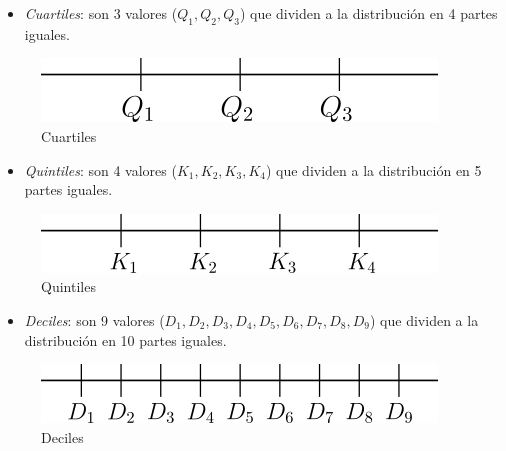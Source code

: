 \documentclass[
]{krantz}
\providecommand{\tightlist}{%
  \setlength{\itemsep}{0pt}\setlength{\parskip}{0pt}}
\begin{document}
\begin{itemize}
\tightlist
\item
  \emph{Cuartiles}: son 3 valores (\(Q_{1}, Q_{2}, Q_{3}\)) que dividen a la distribución en 4 partes iguales.
\end{itemize}

\begin{figure}[!h]

{\centering \includegraphics[width=0.5\linewidth]{cuartiles} 

}

\caption{Cuartiles}\label{fig:cuart}
\end{figure}

\begin{itemize}
\tightlist
\item
  \emph{Quintiles}: son 4 valores (\(K_{1}, K_{2}, K_{3}, K_{4}\)) que dividen a la distribución en 5 partes iguales.
\end{itemize}

\begin{figure}[!h]

{\centering \includegraphics[width=0.5\linewidth]{quintiles} 

}

\caption{Quintiles}\label{fig:quint}
\end{figure}

\begin{itemize}
\tightlist
\item
  \emph{Deciles}: son 9 valores (\(D_1, D_2, D_3, D_4, D_5, D_6, D_7, D_8, D_9\)) que dividen a la distribución en 10 partes iguales.
\end{itemize}

\begin{figure}[!h]

{\centering \includegraphics[width=0.5\linewidth]{deciles} 

}

\caption{Deciles}\label{fig:decil}
\end{figure}
\end{document}
